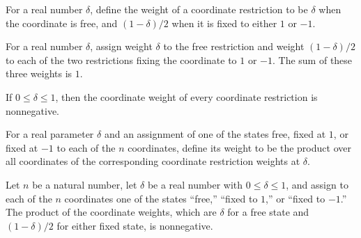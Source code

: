 \begin{definition}
\label{FABL.coordRestrictionWeightAt}
\leanok
{}
For a real number $\delta$, define the weight of a coordinate restriction to be $\delta$
when the coordinate is free, and $(1-\delta)/2$ when it is fixed to either $1$ or $-1$.
\end{definition}

\begin{theorem}
\label{FABL.sum_coordRestrictionWeightAt}
\leanok
{}
For a real number $\delta$, assign weight $\delta$ to the free restriction and weight
$(1-\delta)/2$ to each of the two restrictions fixing the coordinate to $1$ or $-1$. The
sum of these three weights is $1$.
\end{theorem}

\begin{theorem}
\label{FABL.coordRestrictionWeightAt_nonneg}
\leanok
{}
If $0\leq\delta\leq1$, then the coordinate weight of every coordinate restriction is
nonnegative.
\end{theorem}

\begin{definition}
\label{FABL.restrictionAssignmentWeightAt}
\leanok
{}
For a real parameter $\delta$ and an assignment of one of the states free, fixed at $1$,
or fixed at $-1$ to each of the $n$ coordinates, define its weight to be the product
over all coordinates of the corresponding coordinate restriction weights at $\delta$.
\end{definition}

\begin{theorem}
\label{FABL.restrictionAssignmentWeightAt_nonneg}
\leanok
{}
Let $n$ be a natural number, let $\delta$ be a real number with $0\leq \delta\leq 1$, and
assign to each of the $n$ coordinates one of the states “free,” “fixed to $1$,” or
“fixed to $-1$.” The product of the coordinate weights, which are $\delta$ for a free state
and $(1-\delta)/2$ for either fixed state, is nonnegative.
\end{theorem}

